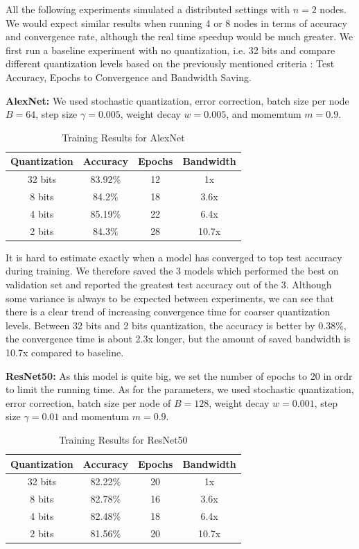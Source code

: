 \documentclass[10pt,conference,compsocconf]{IEEEtran}
\begin{document}
All the following experiments simulated a distributed settings with $n = 2$ nodes. We would expect similar results when running 4 or 8 nodes in terms of accuracy and convergence rate, although the real time speedup would be much greater. We first run a baseline experiment with no quantization, i.e. 32 bits and compare different quantization levels based on the previously mentioned criteria : Test Accuracy, Epochs to Convergence and Bandwidth Saving.

\textbf{AlexNet:} We used stochastic quantization, error correction, batch size per node $B = 64$, step size $\gamma = 0.005$, weight decay $w = 0.005$, and momemtum $m = 0.9$. 

\begin{table}[htbp]
  \centering
  \begin{tabular}[c]{|c||c|c|c|}
    \hline
	  Quantization&Accuracy&Epochs&Bandwidth\\
    \hline
	  32 bits&83.92\% &12&1x\\
	  8 bits&84.2\%&18&3.6x\\
	  4 bits&85.19\%&22&6.4x\\
	  2 bits&84.3\%&28&10.7x\\
    \hline
  \end{tabular}
	\vspace{0.7em}
	\caption{Training Results for AlexNet}
\end{table}

\vspace{-1.5em}
\noindent It is hard to estimate exactly when a model has converged to top test accuracy during training. We therefore saved the 3 models which performed the best on validation set and reported the greatest test accuracy out of the 3. Although some variance is always to be expected between experiments, we can see that there is a clear trend of increasing convergence time for coarser quantization levels. Between 32 bits and 2 bits quantization, the accuracy is better by 0.38\%, the convergence time is about 2.3x longer, but the amount of saved bandwidth is 10.7x compared to baseline.
\vspace{0.3em}


\textbf{ResNet50:} As this model is quite big, we set the number of epochs to 20 in ordr to limit the running time. As for the parameters, we used stochastic quantization, error correction, batch size per node of $B = 128$, weight decay $w = 0.001$, step size $\gamma = 0.01$ and momentum $m = 0.9$.
\begin{table}[htbp]
  \centering
  \begin{tabular}[c]{|c||c|c|c|}
    \hline
          Quantization&Accuracy&Epochs&Bandwidth\\
    \hline
          32 bits&82.22\% &20&1x\\
          8 bits&82.78\%&16&3.6x\\
          4 bits&82.48\%&18&6.4x\\
          2 bits&81.56\%&20&10.7x\\
    \hline
  \end{tabular}
        \vspace{0.7em}
        \caption{Training Results for ResNet50}
\end{table}
\end{document}
